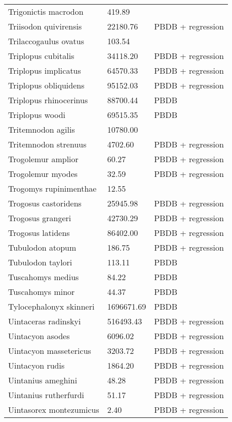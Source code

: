 \begin{center}
\begin{longtable}{p{} p{} p{} }
  Trigonictis macrodon & 419.89 & \cite{Tomiya2013} \\ 
  Triisodon quivirensis & 22180.76 & PBDB + regression \\ 
  Trilaccogaulus ovatus & 103.54 & \cite{Tomiya2013} \\ 
  Triplopus cubitalis & 34118.20 & PBDB + regression \\ 
  Triplopus implicatus & 64570.33 & PBDB + regression \\ 
  Triplopus obliquidens & 95152.03 & PBDB + regression \\ 
  Triplopus rhinocerinus & 88700.44 & PBDB \\ 
  Triplopus woodi & 69515.35 & PBDB \\ 
  Tritemnodon agilis & 10780.00 & \cite{Egi2001} \\ 
  Tritemnodon strenuus & 4702.60 & PBDB + regression \\ 
  Trogolemur amplior & 60.27 & PBDB + regression \\ 
  Trogolemur myodes & 32.59 & PBDB + regression \\ 
  Trogomys rupinimenthae & 12.55 & \cite{Tomiya2013} \\ 
  Trogosus castoridens & 25945.98 & PBDB + regression \\ 
  Trogosus grangeri & 42730.29 & PBDB + regression \\ 
  Trogosus latidens & 86402.00 & PBDB + regression \\ 
  Tubulodon atopum & 186.75 & PBDB + regression \\ 
  Tubulodon taylori & 113.11 & PBDB \\ 
  Tuscahomys medius & 84.22 & PBDB \\ 
  Tuscahomys minor & 44.37 & PBDB \\ 
  Tylocephalonyx skinneri & 1696671.69 & PBDB \\ 
  Uintaceras radinskyi & 516493.43 & PBDB + regression \\ 
  Uintacyon asodes & 6096.02 & PBDB + regression \\ 
  Uintacyon massetericus & 3203.72 & PBDB + regression \\ 
  Uintacyon rudis & 1864.20 & PBDB + regression \\ 
  Uintanius ameghini & 48.28 & PBDB + regression \\ 
  Uintanius rutherfurdi & 51.17 & PBDB + regression \\ 
  Uintasorex montezumicus & 2.40 & PBDB + regression \\ 

\end{longtable}
\end{center}
